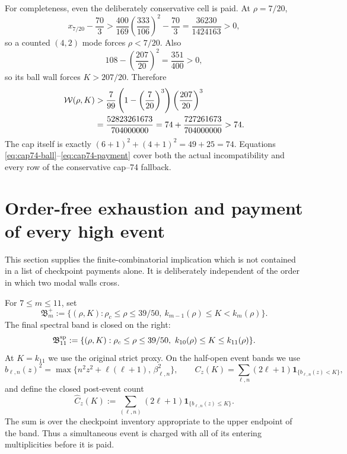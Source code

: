 \documentclass[11pt]{article}
\newcommand{\W}{\mathcal W}
\begin{document}
For completeness, even the deliberately conservative cell is paid.  At
\(\rho=7/20\),
\begin{equation}
 x_{7/20}-\frac{70}{3}
 >\frac{400}{169}\left(\frac{333}{106}\right)^2-\frac{70}{3}
 =\frac{36230}{1424163}>0,
 \label{eq:cap74-rho}
\end{equation}
so a counted \((4,2)\) mode forces \(\rho<7/20\).  Also
\begin{equation}
 108-\left(\frac{207}{20}\right)^2=\frac{351}{400}>0,
 \label{eq:cap74-K}
\end{equation}
so its ball wall forces \(K>207/20\).  Therefore
\begin{align}
 \W(\rho,K)
 &>\frac7{99}\left(1-\left(\frac7{20}\right)^3\right)
       \left(\frac{207}{20}\right)^3\notag\\
 &=\frac{52823261673}{704000000}
 =74+\frac{727261673}{704000000}>74.
 \label{eq:cap74-payment}
\end{align}
The cap itself is exactly
\((6+1)^2+(4+1)^2=49+25=74\).  Equations
\eqref{eq:cap74-ball}--\eqref{eq:cap74-payment} cover both the actual
incompatibility and every row of the conservative cap--74 fallback.

\section{Order-free exhaustion and payment of every high event}
\label{sec:closed-post-event}

This section supplies the finite-combinatorial implication which is not
contained in a list of checkpoint payments alone.  It is deliberately
independent of the order in which two modal walls cross.

For \(7\leq m\leq11\), set
\begin{equation}
 \mathfrak B_m^+
 :=\{(\rho,K):\rho_c\leq\rho\leq39/50,\ 
          k_{m-1}(\rho)\leq K<k_m(\rho)\}.
 \label{eq:post-bands}
\end{equation}
The final spectral band is closed on the right:
\[
 \mathfrak B_{11}^{\rm sp}
 :=\{(\rho,K):\rho_c\leq\rho\leq39/50,\ 
          k_{10}(\rho)\leq K\leq k_{11}(\rho)\}.
\]
At \(K=k_{11}\) we use the original strict proxy.  On the half-open
event bands we use
\[
 b_{\ell,n}(z)^2
 =\max\{n^2z^2+\ell(\ell+1),\,\beta_{\ell,n}^2\},
 \qquad
 C_z(K)=\sum_{\ell,n}(2\ell+1)
             \mathbf1_{\{b_{\ell,n}(z)<K\}},
\]
and define the closed post-event count
\begin{equation}
 \widehat C_z(K)
 :=\sum_{(\ell,n)}(2\ell+1)
       \mathbf 1_{\{b_{\ell,n}(z)\leq K\}}.
 \label{eq:closed-post-count}
\end{equation}
The sum is over the checkpoint inventory appropriate to the upper endpoint
of the band.  Thus a simultaneous event is charged with all of its entering
multiplicities before it is paid.
\end{document}
